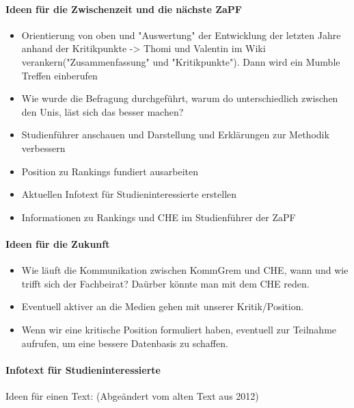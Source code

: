     \paragraph{Ideen für die Zwischenzeit und die nächste ZaPF}
      \begin{itemize}
        \item Orientierung von oben und "Auswertung" der Entwicklung der letzten Jahre anhand der Kritikpunkte -> Thomi und Valentin im Wiki verankern("Zusammenfassung" und "Kritikpunkte"). Dann wird ein Mumble Treffen einberufen
        \item Wie wurde die Befragung durchgeführt, warum do unterschiedlich zwischen den Unis, läst sich das besser machen?
        \item Studienführer anschauen und Darstellung und Erklärungen zur Methodik verbessern
        \item Position zu Rankings fundiert ausarbeiten
        \item Aktuellen Infotext für Studieninteressierte erstellen
        \item Informationen zu Rankings und CHE im Studienführer der ZaPF
      \end{itemize}

    \paragraph{Ideen für die Zukunft}
      \begin{itemize}
        \item Wie läuft die Kommunikation zwischen KommGrem und CHE, wann und wie trifft sich der Fachbeirat? Daürber könnte man mit dem CHE reden.
        \item Eventuell aktiver an die Medien gehen mit unserer Kritik/Position.
        \item Wenn wir eine kritische Position formuliert haben, eventuell zur Teilnahme aufrufen, um eine bessere Datenbasis zu schaffen.
      \end{itemize}

    \paragraph{Infotext für Studieninteressierte}
      Ideen für einen Text: (Abgeändert vom alten Text aus 2012) \\

